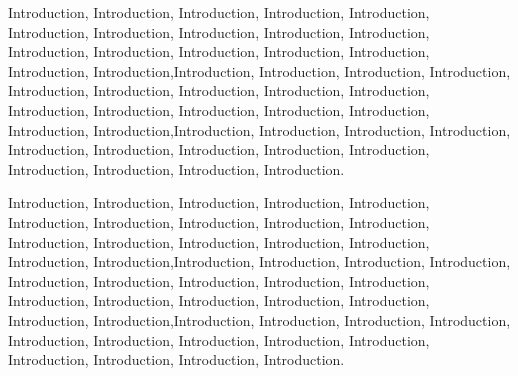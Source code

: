 Introduction, Introduction, Introduction, Introduction, Introduction, Introduction, Introduction, Introduction, Introduction, Introduction, Introduction, Introduction, Introduction, Introduction, Introduction, Introduction, Introduction,Introduction, Introduction, Introduction, Introduction, Introduction, Introduction, Introduction, Introduction, Introduction, Introduction, Introduction, Introduction, Introduction, Introduction, Introduction, Introduction,Introduction, Introduction, Introduction, Introduction, Introduction, Introduction, Introduction, Introduction, Introduction, Introduction, Introduction, Introduction, Introduction.

Introduction, Introduction, Introduction, Introduction, Introduction, Introduction, Introduction, Introduction, Introduction, Introduction, Introduction, Introduction, Introduction, Introduction, Introduction, Introduction, Introduction,Introduction, Introduction, Introduction, Introduction, Introduction, Introduction, Introduction, Introduction, Introduction, Introduction, Introduction, Introduction, Introduction, Introduction, Introduction, Introduction,Introduction, Introduction, Introduction, Introduction, Introduction, Introduction, Introduction, Introduction, Introduction, Introduction, Introduction, Introduction, Introduction.
